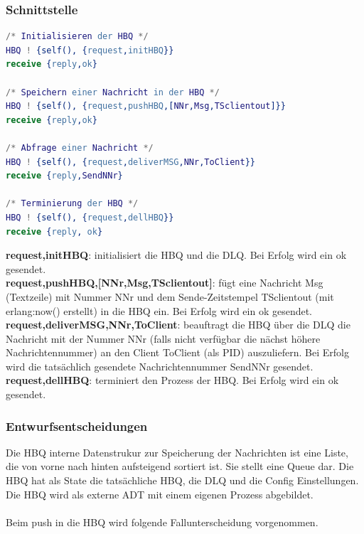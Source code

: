 \documentclass{article}
\begin{document}
\subsubsection{Schnittstelle}
\begin{lstlisting}[language=Erlang]
/* Initialisieren der HBQ */
HBQ ! {self(), {request,initHBQ}}
receive {reply,ok}

/* Speichern einer Nachricht in der HBQ */
HBQ ! {self(), {request,pushHBQ,[NNr,Msg,TSclientout]}}
receive {reply,ok}

/* Abfrage einer Nachricht */
HBQ ! {self(), {request,deliverMSG,NNr,ToClient}}
receive {reply,SendNNr}

/* Terminierung der HBQ */
HBQ ! {self(), {request,dellHBQ}}
receive {reply, ok}
\end{lstlisting}

\textbf{{request,initHBQ}}: initialisiert die HBQ und die DLQ. Bei Erfolg wird ein ok gesendet.\\

\textbf{{request,pushHBQ,[NNr,Msg,TSclientout]}}: fügt eine Nachricht Msg (Textzeile) mit Nummer NNr und dem
Sende-Zeitstempel TSclientout (mit erlang:now() erstellt) in die HBQ ein. Bei Erfolg wird ein ok gesendet.\\

\textbf{{request,deliverMSG,NNr,ToClient}}: beauftragt die HBQ über die DLQ die Nachricht mit der Nummer NNr
(falls nicht verfügbar die nächst höhere Nachrichtennummer) an den Client ToClient (als PID) auszuliefern. Bei Erfolg
wird die tatsächlich gesendete Nachrichtennummer SendNNr gesendet.\\

\textbf{{request,dellHBQ}}: terminiert den Prozess der HBQ. Bei Erfolg wird ein ok gesendet.\\

\subsubsection{Entwurfsentscheidungen}
Die HBQ interne Datenstrukur zur Speicherung der Nachrichten ist eine Liste, die von vorne nach hinten aufsteigend
sortiert ist. Sie stellt eine Queue dar. Die HBQ hat als State die tatsächliche HBQ, die DLQ und die Config
Einstellungen. Die HBQ wird als externe ADT mit einem eigenen Prozess abgebildet.\\
\\
Beim push in die HBQ wird folgende Fallunterscheidung vorgenommen.
\end{document}
